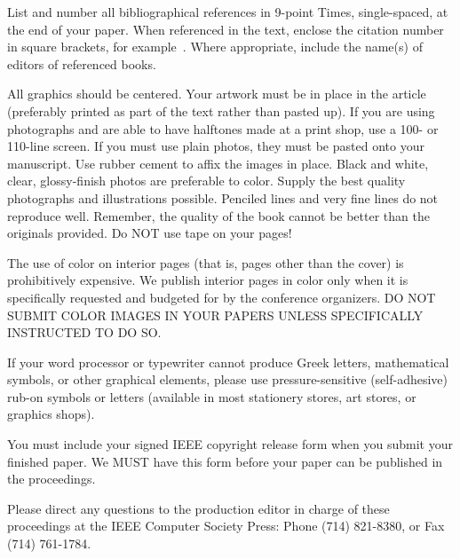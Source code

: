 \documentclass[times, 10pt,twocolumn]{article}
\begin{document}

List and number all bibliographical references in 9-point Times,
single-spaced, at the end of your paper. When referenced in the text,
enclose the citation number in square brackets, for example~\cite{ex1}.
Where appropriate, include the name(s) of editors of referenced books.


All graphics should be centered. Your artwork must be in place in the
article (preferably printed as part of the text rather than pasted up).
If you are using photographs and are able to have halftones made at a
print shop, use a 100- or 110-line screen. If you must use plain photos,
they must be pasted onto your manuscript. Use rubber cement to affix the
images in place. Black and white, clear, glossy-finish photos are
preferable to color. Supply the best quality photographs and illustrations
possible. Penciled lines and very fine lines do not reproduce well.
Remember, the quality of the book cannot be better than the originals
provided. Do NOT use tape on your pages!


The use of color on interior pages (that is, pages other than the cover)
is prohibitively expensive. We publish interior pages in color only when
it is specifically requested and budgeted for by the conference
organizers. DO NOT SUBMIT COLOR IMAGES IN YOUR PAPERS UNLESS SPECIFICALLY
INSTRUCTED TO DO SO.


If your word processor or typewriter cannot produce Greek letters,
mathematical symbols, or other graphical elements, please use
pressure-sensitive (self-adhesive) rub-on symbols or letters (available in
most stationery stores, art stores, or graphics shops).


You must include your signed IEEE copyright release form when you submit
your finished paper. We MUST have this form before your paper can be
published in the proceedings.


Please direct any questions to the production editor in charge of these
proceedings at the IEEE Computer Society Press: Phone (714) 821-8380, or
Fax (714) 761-1784.

\nocite{ex1,ex2}  
\end{document}
